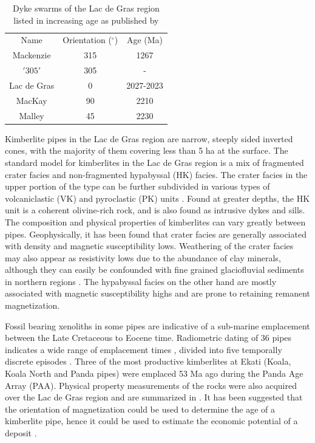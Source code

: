 \begin{table}
\centering
\caption{Dyke swarms of the Lac de Gras region listed in increasing age as published by \cite{Buchan09}}
\label{tbl:Dykes}
\renewcommand{\arraystretch}{1.2}
\begin{tabular}{|c|c|c|}
Name & Orientation ($^\circ$) & Age (Ma) \\
Mackenzie & 315 & 1267 \\
$'305'$ & 305 & - \\
Lac de Gras & 0 & 2027-2023 \\
MacKay & 90 & 2210 \\
Malley & 45 & 2230
\end{tabular}
\end{table}


Kimberlite pipes in the Lac de Gras region are narrow, steeply sided inverted cones, with the majority of them covering less than 5 ha at the surface.
The standard model for kimberlites in the Lac de Gras region is a mix of fragmented crater facies and non-fragmented hypabyssal (HK) facies.
The crater facies in the upper portion of the type can be further subdivided in various types of volcaniclastic (VK) and pyroclastic (PK) units \cite[]{Pell1997}.
Found at greater depths, the HK unit is a coherent olivine-rich rock, and is also found as intrusive dykes and sills.
The composition and physical properties of kimberlites can vary greatly between pipes.
Geophysically, it has been found that crater facies are generally associated with density and magnetic susceptibility lows.
Weathering of the crater facies may also appear as resistivity lows due to the abundance of clay minerals, although they can easily be confounded with fine grained glaciofluvial sediments in northern regions \cite[]{PowerHildes2007}.
The hypabyssal facies on the other hand are mostly associated with magnetic susceptibility highs and are prone to retaining remanent magnetization.

Fossil bearing xenoliths in some pipes are indicative of a sub-marine emplacement between the Late Cretaceous to Eocene time.
Radiometric dating of 36 pipes indicates a wide range of emplacement times \cite[]{Creaser2004}, divided into five temporally discrete episodes \cite[]{Lockhart2004}. Three of the most productive kimberlites at Ekati (Koala, Koala North and Panda pipes) were emplaced 53 Ma ago during the Panda Age Array (PAA).
Physical property measurements of the rocks were also acquired over the Lac de Gras region and are summarized in \cite[]{Enkin2003, Buchan09}.
It has been suggested that the orientation of magnetization could be used to determine the age of a kimberlite pipe, hence it could be used to estimate the economic potential of a deposit \cite[]{Lockhart2004}.

